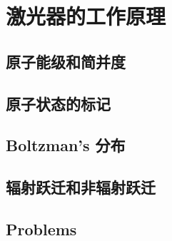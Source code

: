 \chapter{激光器的工作原理}
\section{原子能级和简并度}
\section{原子状态的标记}
\section{Boltzman's 分布}
\section{辐射跃迁和非辐射跃迁}
\newpage
\section*{Problems}
\begin{problem}
    
\end{problem}
